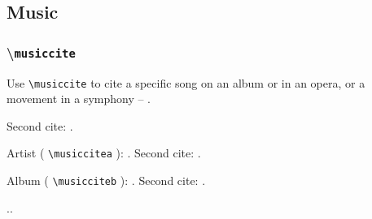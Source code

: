 \documentclass{article}
\newcommand\showcmnd[1]{%
\textbackslash\texttt{#1}%
}
\newcommand\showcmndc[1]{%
\texttt{\colorbox{blue!20!green!12}{\textbackslash#1}}%
}
\newcommand\cbb[1]{%
\colorbox{red!20!yellow!25}{#1}%
}
\begin{document}
\tableofcontents

\subsection{Music}
\subsubsection{\showcmnd{musiccite}}
Use \showcmndc{musiccite} to cite a specific song on an album or in an opera, or a movement in a symphony -- {\color{blue}}.


Second cite: .

Artist (\showcmndc{musiccitea}): 
 \cbb{}.
 Second cite: 
 \cbb{\musiccitea{jcollins}}.

Album (\showcmndc{musicciteb}):
\cbb{}. 
Second cite: 
\cbb{\musicciteb{judith}}.


..

\newrefcontext[sorting=sortmusic]
\printbibliography[
	heading=subbibliography,%
	type=bibmusic,
	title={Music}
	]
\end{document}
